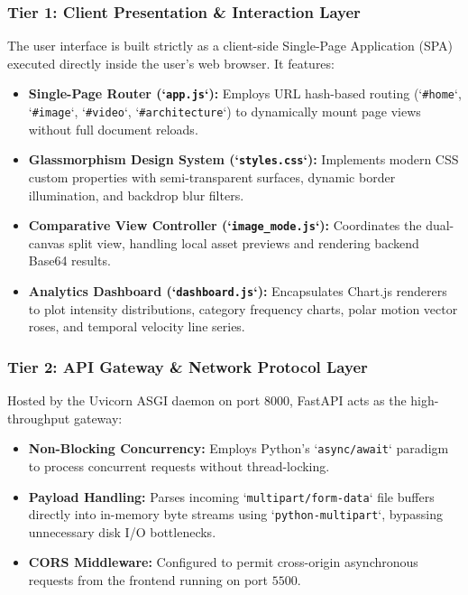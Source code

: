 \subsubsection{Tier 1: Client Presentation \& Interaction Layer}
The user interface is built strictly as a client-side Single-Page Application (SPA) executed directly inside the user's web browser. It features:
\begin{itemize}
    \item \textbf{Single-Page Router (`\texttt{app.js}`):} Employs URL hash-based routing (`\texttt{\#home}`, `\texttt{\#image}`, `\texttt{\#video}`, `\texttt{\#architecture}`) to dynamically mount page views without full document reloads.
    \item \textbf{Glassmorphism Design System (`\texttt{styles.css}`):} Implements modern CSS custom properties with semi-transparent surfaces, dynamic border illumination, and backdrop blur filters.
    \item \textbf{Comparative View Controller (`\texttt{image\_mode.js}`):} Coordinates the dual-canvas split view, handling local asset previews and rendering backend Base64 results.
    \item \textbf{Analytics Dashboard (`\texttt{dashboard.js}`):} Encapsulates Chart.js renderers to plot intensity distributions, category frequency charts, polar motion vector roses, and temporal velocity line series.
\end{itemize}

\subsubsection{Tier 2: API Gateway \& Network Protocol Layer}
Hosted by the Uvicorn ASGI daemon on port $8000$, FastAPI acts as the high-throughput gateway:
\begin{itemize}
    \item \textbf{Non-Blocking Concurrency:} Employs Python's `\texttt{async/await}` paradigm to process concurrent requests without thread-locking.
    \item \textbf{Payload Handling:} Parses incoming `\texttt{multipart/form-data}` file buffers directly into in-memory byte streams using `\texttt{python-multipart}`, bypassing unnecessary disk I/O bottlenecks.
    \item \textbf{CORS Middleware:} Configured to permit cross-origin asynchronous requests from the frontend running on port $5500$.
\end{itemize}


